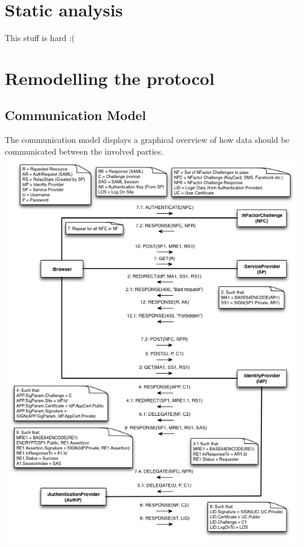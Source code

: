 \documentclass[twosided]{report}
\begin{document}
\chapter{Static analysis}
This stuff is hard :(


\chapter{Remodelling the protocol}

\section{Communication Model}
The communication model displays a graphical overview of how data should be communicated between the involved parties.
\newpage
\includegraphics[]{images/Communication.png}
\end{document}
